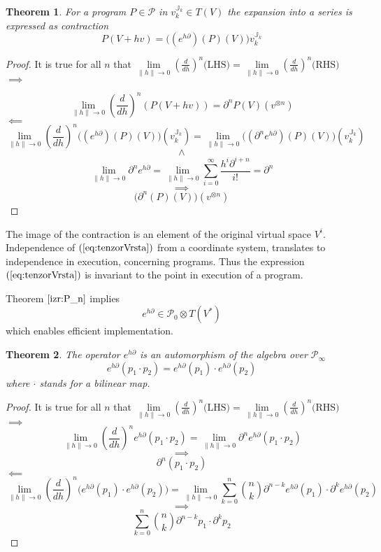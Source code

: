 \documentclass{article}
\newcommand{\JJ}{\mathbb{J}}
\newcommand{\dP}{\mathcal{P}}
\newcommand{\D}{\partial}
\newtheorem{izrek}{Theorem}[section]
\begin{document}
\begin{izrek}\label{izr:e^d}
	For a program $P\in\dP$ in $v^{\JJ_k}_{k}\in T(V)$ the expansion into a series is expressed as contraction\\
	\begin{equation}\label{eq:tenzorVrsta}
	P(V+hv) = \Big((e^{h\D})(P)(V)\Big)v^{\JJ_k}_{k}
	\end{equation}
\end{izrek}
 
 \begin{proof}
It is true for all $n$ that $\lim\limits_{\lVert h\rVert\to 0}(\frac{d}{dh})^n\text{(LHS)}=\lim\limits_{\lVert h\rVert\to 0}(\frac{d}{dh})^n\text{(RHS)}$\\
 $\implies$
 
 $$\lim\limits_{\lVert h\rVert\to 0}(\frac{d}{dh})^n(P(V+hv))=\D^n P(V)(v^{\otimes n})$$
 $\impliedby$
 $$\lim\limits_{\lVert h\rVert\to 0}(\frac{d}{dh})^n\Big((e^{h\D})(P)(V)\Big)(v^{\JJ_k}_{k})=\lim\limits_{\lVert h\rVert\to 0}\Big((\D^n e^{h\D})(P)(V)\Big)(v^{\JJ_k}_{k})$$
 $$\land$$
 $$\lim\limits_{\lVert h\rVert\to 0}\D^ne^{h\D}=\lim\limits_{\lVert h\rVert\to 0}\sum\limits_{i=0}^{\infty}\frac{h^i\D^{i+n}}{i!}=\D^n$$
 $$\implies$$
 $$\Big(\D^n(P)(V)\Big)(v^{\otimes n})$$
 \end{proof}
 
 The image of the contraction is an element of the original virtual space $V^i$. Independence of $(\ref{eq:tenzorVrsta})$ from a coordinate system, translates to independence in execution, concerning programs. Thus the expression $(\ref{eq:tenzorVrsta})$ is invariant to the point in execution of a program.  
 
 Theorem $\ref{izr:P_n}$ implies
     \begin{equation}
     	e^{h\D}\in\dP_0\otimes T(V^*)
     \end{equation}      
which enables efficient implementation.
 
 \begin{izrek}\label{izr:prod}
 The operator $e^{h\D}$ is an automorphism of the algebra over $\dP_\infty$
 \begin{equation}
 	e^{h\D}(p_1\cdot p_2)=e^{h\D}(p_1)\cdot e^{h\D}(p_2)
 \end{equation}
 where $\cdot$ stands for a bilinear map.
 \end{izrek}
 
 \begin{proof}
 It is true for all $n$ that $\lim\limits_{\lVert h\rVert\to 0}(\frac{d}{dh})^n\text{(LHS)}=\lim\limits_{\lVert h\rVert\to 0}(\frac{d}{dh})^n\text{(RHS)}$\\
  $\implies$
  $$\lim\limits_{\lVert h\rVert\to 0}(\frac{d}{dh})^ne^{h\D}(p_1\cdot p_2)=\lim\limits_{\lVert h\rVert\to 0}\D^ne^{h\D}(p_1\cdot p_2)$$
  $$\implies$$
  $$\D^n(p_1\cdot p_2)$$
  $\impliedby$
  $$\lim\limits_{\lVert h\rVert\to 0}(\frac{d}{dh})^n\Big(e^{h\D}(p_1)\cdot e^{h\D}(p_2)\Big)=\lim\limits_{\lVert h\rVert\to 0}\sum\limits_{k=0}^{n}{n\choose k}\D^{n-k}e^{h\D}(p_1)\cdot \D^ke^{h\D}(p_2)$$
  $$\implies$$
  $$\sum\limits_{k=0}^{n}{n\choose k}\D^{n-k}p_1\cdot \D^kp_2$$
 \end{proof}
 
\end{document}
